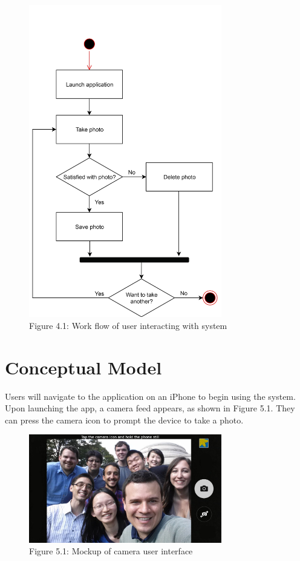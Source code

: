 \documentclass{scu-thesis}
\begin{document}
\begin{figure}[!h]
    \centering
    \includegraphics[width=0.75\textwidth]{activitydiagram}
    \caption{Figure 4.1: Work flow of user interacting with system}
    \label{fig:activitydiagram}
\end{figure}

\chapter{Conceptual Model}

Users will navigate to the application on an iPhone to begin using the system. Upon launching the app, a camera feed appears, as shown in Figure 5.1. They can press the camera icon to prompt the device to take a photo. 

\begin{figure}[!h]
    \centering
    \includegraphics[width=0.75\textwidth]{conceptualmodel1}
    \caption{Figure 5.1: Mockup of camera user interface}
    \label{fig:conceptualmodel1}
\end{figure}
\end{document}
